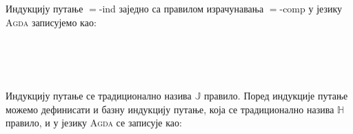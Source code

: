Индукцију путање $=$-ind заједно са правилом израчунавања $=$-comp у језику \textsc{Agda} записујемо као:
\begin{code}%
\>[0]%
\>[1047I]\AgdaSymbol{:}\AgdaSpace{}%
\AgdaSymbol{(}\AgdaSpace{}%
\AgdaSymbol{:}\AgdaSpace{}%
\AgdaSpace{}%
\AgdaSpace{}%
\AgdaSymbol{)}\AgdaSpace{}%
\AgdaSymbol{(}\AgdaSpace{}%
\AgdaSymbol{:}\AgdaSpace{}%
\AgdaSymbol{(}\AgdaSpace{}%
\AgdaSpace{}%
\AgdaSymbol{:}\AgdaSpace{}%
\AgdaSymbol{)}\AgdaSpace{}%
\AgdaSpace{}%
\AgdaSpace{}%
\AgdaOperator{\AgdaFunction{==}}\AgdaSpace{}%
\AgdaSpace{}%
\AgdaSpace{}%
\AgdaSpace{}%
\AgdaSpace{}%
\AgdaSymbol{)}\<%
\\
\>[.][@{}l@{}]\<[1047I]%
\>[2]\AgdaSpace{}%
\AgdaSymbol{((}\AgdaSpace{}%
\AgdaSymbol{:}\AgdaSpace{}%
\AgdaSymbol{)}\AgdaSpace{}%
\AgdaSpace{}%
\AgdaSpace{}%
\AgdaSpace{}%
\AgdaSpace{}%
\AgdaSymbol{(}\AgdaSpace{}%
\AgdaSymbol{))}\<%
\\
%
\>[2]\AgdaSpace{}%
\AgdaSymbol{((}\AgdaSpace{}%
\AgdaSpace{}%
\AgdaSymbol{:}\AgdaSpace{}%
\AgdaSymbol{)}\AgdaSpace{}%
\AgdaSymbol{(}\AgdaSpace{}%
\AgdaSymbol{:}\AgdaSpace{}%
\AgdaSpace{}%
\AgdaOperator{\AgdaFunction{==}}\AgdaSpace{}%
\AgdaSymbol{)}\AgdaSpace{}%
\AgdaSpace{}%
\AgdaSpace{}%
\AgdaSpace{}%
\AgdaSpace{}%
\AgdaSymbol{)}\<%
\\
\>[0]\AgdaSpace{}%
\AgdaSpace{}%
\AgdaSpace{}%
\AgdaSpace{}%
\AgdaSpace{}%
\AgdaSpace{}%
\AgdaSymbol{(}\AgdaSpace{}%
\AgdaSymbol{)}\AgdaSpace{}%
\AgdaSymbol{=}\AgdaSpace{}%
\AgdaSpace{}%
\<%
\end{code}
Индукцију путање се традиционално назива $\mathbb{J}$ правило. Поред индукције путање можемо дефинисати и базну индукцију путање, која се традиционално назива $\mathbb{H}$ правило, и у језику \textsc{Agda} се записује као:
